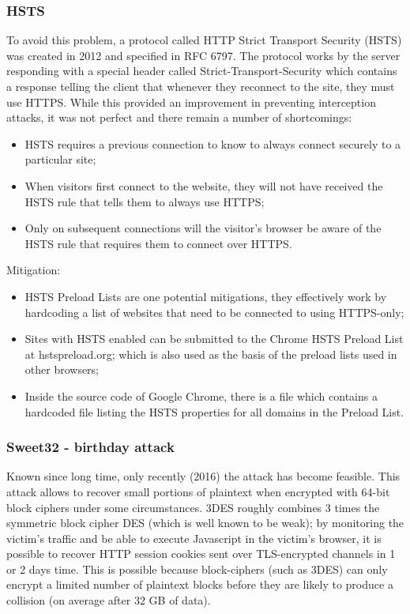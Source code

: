 \documentclass[a4paper, 10pt, titlepage]{article}
\begin{document}
\subsubsection*{HSTS}
To avoid this problem, a protocol called HTTP Strict Transport Security (HSTS) was created in 2012 and specified in RFC 6797. The protocol works by the server responding with a special header called Strict-Transport-Security which contains a response telling the client that whenever they reconnect to the site, they must use HTTPS. While this provided an improvement in preventing interception attacks, it was not perfect and there remain a number of shortcomings:
\begin{itemize}
\item HSTS requires a previous connection to know to always connect securely to a particular site;
\item When visitors first connect to the website, they will not have received the HSTS rule that tells them to always use HTTPS;
\item Only on subsequent connections will the visitor's browser be aware of the HSTS rule that requires them to connect over HTTPS.
\end{itemize}
Mitigation:
\begin{itemize}
\item HSTS Preload Lists are one potential mitigations, they effectively work by hardcoding a list of websites that need to be connected to using HTTPS-only;
\item Sites with HSTS enabled can be submitted to the Chrome HSTS Preload List at hstspreload.org; which is also used as the basis of the preload lists used in other browsers;
\item Inside the source code of Google Chrome, there is a file which contains a hardcoded file listing the HSTS properties for all domains in the Preload List.
\end{itemize}
\subsubsection{Sweet32 - birthday attack}
Known since long time, only recently (2016) the attack has become
feasible. This attack allows to recover small portions of plaintext when encrypted with 64-bit block ciphers under some circumstances.  3DES roughly combines 3 times the symmetric block cipher DES (which
is well known to be weak); by monitoring the victim’s traffic and be able to execute Javascript in the victim’s browser, it is possible to recover HTTP session cookies sent over TLS-encrypted channels in 1 or 2 days time. This is possible because block-ciphers (such as 3DES) can only encrypt a limited number of plaintext blocks before they are likely to produce a collision (on average after 32 GB of data).
\end{document}
